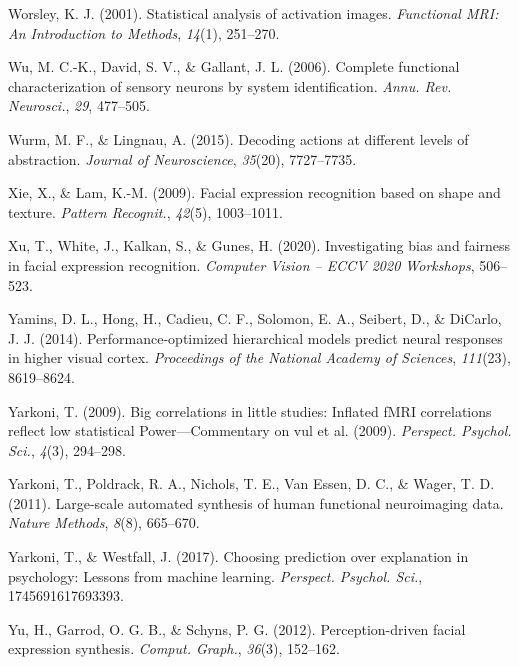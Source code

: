\documentclass[11pt,american,a4paper,oneside,]{memoir} %
\begin{document}
\leavevmode\hypertarget{ref-worsley2001statistical}{}%
Worsley, K. J. (2001). Statistical analysis of activation images. \emph{Functional MRI: An Introduction to Methods}, \emph{14}(1), 251--270.

\leavevmode\hypertarget{ref-Wu2006-qs}{}%
Wu, M. C.-K., David, S. V., \& Gallant, J. L. (2006). Complete functional characterization of sensory neurons by system identification. \emph{Annu. Rev. Neurosci.}, \emph{29}, 477--505.

\leavevmode\hypertarget{ref-wurm2015decoding}{}%
Wurm, M. F., \& Lingnau, A. (2015). Decoding actions at different levels of abstraction. \emph{Journal of Neuroscience}, \emph{35}(20), 7727--7735.

\leavevmode\hypertarget{ref-Xie2009-fp}{}%
Xie, X., \& Lam, K.-M. (2009). Facial expression recognition based on shape and texture. \emph{Pattern Recognit.}, \emph{42}(5), 1003--1011.

\leavevmode\hypertarget{ref-Xu2020-jd}{}%
Xu, T., White, J., Kalkan, S., \& Gunes, H. (2020). Investigating bias and fairness in facial expression recognition. \emph{Computer Vision -- ECCV 2020 Workshops}, 506--523.

\leavevmode\hypertarget{ref-yamins2014performance}{}%
Yamins, D. L., Hong, H., Cadieu, C. F., Solomon, E. A., Seibert, D., \& DiCarlo, J. J. (2014). Performance-optimized hierarchical models predict neural responses in higher visual cortex. \emph{Proceedings of the National Academy of Sciences}, \emph{111}(23), 8619--8624.

\leavevmode\hypertarget{ref-Yarkoni2009-pz}{}%
Yarkoni, T. (2009). Big correlations in little studies: Inflated fMRI correlations reflect low statistical Power---Commentary on vul et al. (2009). \emph{Perspect. Psychol. Sci.}, \emph{4}(3), 294--298.

\leavevmode\hypertarget{ref-yarkoni2011large}{}%
Yarkoni, T., Poldrack, R. A., Nichols, T. E., Van Essen, D. C., \& Wager, T. D. (2011). Large-scale automated synthesis of human functional neuroimaging data. \emph{Nature Methods}, \emph{8}(8), 665--670.

\leavevmode\hypertarget{ref-Yarkoni2017-om}{}%
Yarkoni, T., \& Westfall, J. (2017). Choosing prediction over explanation in psychology: Lessons from machine learning. \emph{Perspect. Psychol. Sci.}, 1745691617693393.

\leavevmode\hypertarget{ref-Yu2012-ag}{}%
Yu, H., Garrod, O. G. B., \& Schyns, P. G. (2012). Perception-driven facial expression synthesis. \emph{Comput. Graph.}, \emph{36}(3), 152--162.
\end{document}
